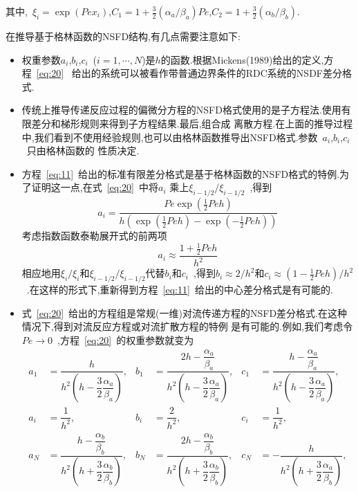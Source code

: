 \documentclass[a4paper,cs4size,adobefonts,cm-default,no-math]{ctexart}
\begin{document}
其中,~$\xi_i=\exp(Pex_i)$,$C_1=1+\frac{3}{2}(\alpha_a/\beta_a)Pe$,$C_2=1+\frac{3}{2}(\alpha_b/\beta_b)$.\par
\vspace*{0.4em}
在推导基于格林函数的NSFD结构,有几点需要注意如下:
\begin{itemize}
 \item 权重参数$a_i$,$b_i$,$c_i$~($i=1,\cdots,N$)是$h$的函数.根据Mickens(1989)给出的定义,方程~\ref{eq:20}~
 给出的系统可以被看作带普通边界条件的RDC系统的NSDF差分格式.
 \item 传统上推导传递反应过程的偏微分方程的NSFD格式使用的是子方程法.使用有限差分和梯形规则来得到子方程结果.最后,组合成
 离散方程.在上面的推导过程中,我们看到不使用经验规则,也可以由格林函数推导出NSFD格式.参数~$a_i$,$b_i$,$c_i$~只由格林函数的
 性质决定.
 \item 方程~\ref{eq:11}~给出的标准有限差分格式是基于格林函数的NSFD格式的特例.为了证明这一点,在式~\ref{eq:20}~中将$a_i$
 乘上$\xi_{i-1/2}/\xi_{i-1/2}$~,得到
 \begin{equation*}
  a_i=\dfrac{Pe\exp(\frac{1}{2}Peh)}{h(\exp(\frac{1}{2}Peh)-\exp(-\frac{1}{2}Peh))}
 \end{equation*}
考虑指数函数泰勒展开式的前两项
\begin{equation*}
 a_i \approx \dfrac{1+\frac{1}{2}Peh}{h^2}
\end{equation*}
相应地用$\xi_i/\xi_i$和$\xi_{i-1/2}/\xi_{i-1/2}$代替$b_i$和$c_i$~,得到$b_i\approx2/h^2$和$c_i\approx(1-\frac{1}{2}
Peh)/h^2$~.在这样的形式下,重新得到方程~\ref{eq:11}~给出的中心差分格式是有可能的.
\item 式~\ref{eq:20}~给出的方程组是常规(一维)对流传递方程的NSFD差分格式.在这种情况下,得到对流反应方程或对流扩散方程的特例
是有可能的.例如,我们考虑令$Pe\rightarrow0$~,方程~\ref{eq:20}~的权重参数就变为
\begin{align*}
 a_1 &= \dfrac{h}{h^2\left(h-\dfrac{3}{2}\dfrac{\alpha_a}{\beta_a}\right)}, 
 & b_1&=\dfrac{2h-\dfrac{\alpha_a}{\beta_a}}{h^2\left(h-\dfrac{3}{2}\dfrac{\alpha_a}{\beta_a}\right)}, 
 & c_1 &=\dfrac{h-\dfrac{\alpha_a}{\beta_a}}{h^2\left(h-\dfrac{3}{2}\dfrac{\alpha_a}{\beta_a}\right)},\\
 a_i &=\dfrac{1}{h^2}, & b_i&=\dfrac{2}{h^2}, & c_i&=\dfrac{1}{h^2}, \\
 a_N &=\dfrac{h-\dfrac{\alpha_b}{\beta_b}}{h^2\left(h+\dfrac{3}{2}\dfrac{\alpha_b}{\beta_b}\right)}, &
 b_N &=\dfrac{2h-\dfrac{\alpha_b}{\beta_b}}{h^2\left(h+\dfrac{3}{2}\dfrac{\alpha_b}{\beta_b}\right)}, &
 c_N &=-\dfrac{h}{h^2\left(h+\dfrac{3}{2}\dfrac{\alpha_a}{\beta_b}\right)},

\end{align*}
\end{itemize}
\end{document}
